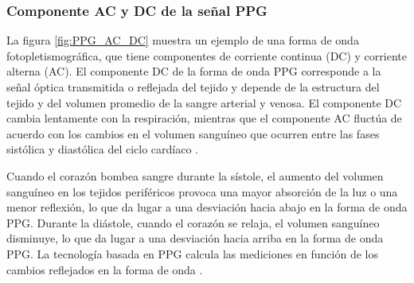         
        \subsubsection{Componente AC y DC de la señal PPG}
            La figura \ref{fig:PPG_AC_DC} muestra un ejemplo de una forma de onda fotopletismográfica, que tiene componentes de corriente continua (DC) y corriente alterna (AC). El componente DC de la forma de onda PPG corresponde a la señal óptica transmitida o reflejada del tejido y depende de la estructura del tejido y del volumen promedio de la sangre arterial y venosa. El componente DC cambia lentamente con la respiración, mientras que el componente AC fluctúa de acuerdo con los cambios en el volumen sanguíneo que ocurren entre las fases sistólica y diastólica del ciclo cardíaco \cite{Tamura_2019}.

            Cuando el corazón bombea sangre durante la sístole, el aumento del volumen sanguíneo en los tejidos periféricos provoca una mayor absorción de la luz o una menor reflexión, lo que da lugar a una desviación hacia abajo en la forma de onda PPG. Durante la diástole, cuando el corazón se relaja, el volumen sanguíneo disminuye, lo que da lugar a una desviación hacia arriba en la forma de onda PPG. La tecnología basada en PPG calcula las mediciones en función de los cambios reflejados en la forma de onda \cite{Cabessa_2024}.

